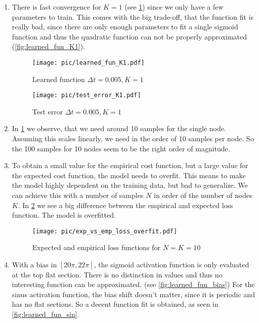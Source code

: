 \documentclass[a4paper,11pt]{scrartcl}
\newcommand*{\Dt}{\Delta{}t}
\begin{document}
\begin{enumerate}
\begin{enumerate}[leftmargin=1em]
  \item
    There is fast convergence for $K=1$ (see \cref{fig:test_error_K1}) since we
    only have a few parameters to train.
    This comes with the big trade-off, that the function fit is really bad,
    since there are only enough parameters to fit a single sigmoid function
    and thus the quadratic function can not be properly approximated (\cref{fig:learned_fun_K1}).

    \begin{figure}[H]
        \begin{minipage}[t]{.5\linewidth}
          \centering
          \texttt{[image: pic/learned\_fun\_K1.pdf]}
          \caption{Learned function $\Dt=0.005, K=1$}
          \label{fig:learned_fun_K1}
        \end{minipage}%
        \begin{minipage}[t]{.5\linewidth}
          \centering
          \texttt{[image: pic/test\_error\_K1.pdf]}
          \caption{Test error $\Dt=0.005, K=1$}
          \label{fig:test_error_K1}
        \end{minipage}
    \end{figure}

   \item
     In \cref{fig:test_error_K1} we observe, that we need around 10 samples for
     the single node.
     Assuming this scales linearly, we need in the order of 10 samples per node.
     So the 100 samples for 10 nodes seem to be the right order of magnitude.

   \item
     To obtain a small value for the empirical cost function, but a large value
     for the expected cost function, the model needs to overfit.
     This means to make the model highly dependent on the training data, but bad
     to generalize.
     We can achieve this with a number of samples $N$ in order of the number of
     nodes $K$.
     In \cref{fig:exp_vs_emp_overfit} we see a big difference between the
     empirical and expected loss function.
     The model is overfitted.

    \begin{figure}[H]
        \centering
        \texttt{[image: pic/exp\_vs\_emp\_loss\_overfit.pdf]}
        \caption{Expected and empirical loss functions for $N=K=10$}
        \label{fig:exp_vs_emp_overfit}
    \end{figure}

   \item
     With a bias in $[20\pi, 22\pi]$, the sigmoid activation function is
     only evaluated at the top flat section.
     There is no distinction in values and thus no interesting function can be approximated.
     (see \cref{fig:learned_fun_bias})
     For the sinus activation function, the bias shift doesn't matter, since it is
     periodic and has no flat sections.
     So a decent function fit is obtained, as seen in \cref{fig:learned_fun_sin}.


\end{enumerate}
\end{enumerate}
\end{document}
